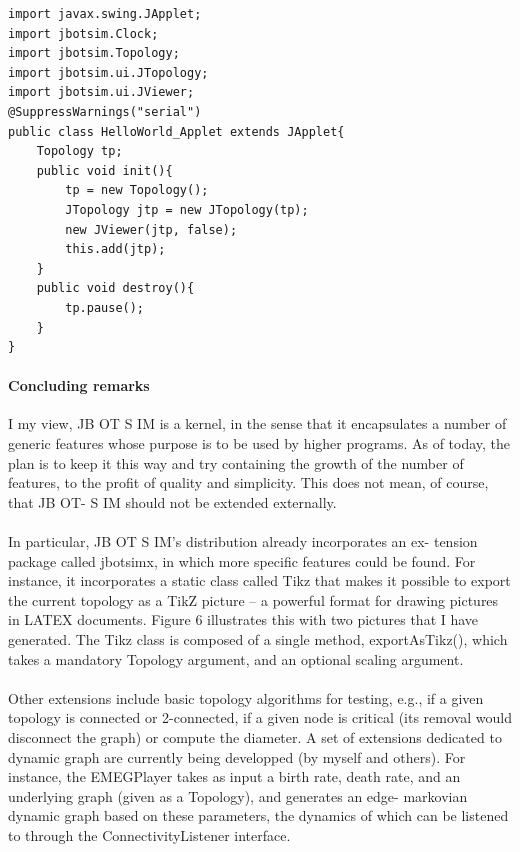 \begin{lstlisting}[caption=Embedding a JB OT S IM demo into a java applet, captionpos=b]
import javax.swing.JApplet;
import jbotsim.Clock;
import jbotsim.Topology;
import jbotsim.ui.JTopology;
import jbotsim.ui.JViewer;
@SuppressWarnings("serial")
public class HelloWorld_Applet extends JApplet{
	Topology tp;
	public void init(){
		tp = new Topology();
		JTopology jtp = new JTopology(tp);
		new JViewer(jtp, false);
		this.add(jtp);
	}
	public void destroy(){
		tp.pause();
	}
}
\end{lstlisting}

\paragraph{Concluding remarks}I my view, JB OT S IM is a kernel, in the sense that it encapsulates a number of generic features whose purpose is to be used by higher programs. As of today, the plan is to keep it this way and try containing the growth of the number of features, to the profit of quality and simplicity. This does not mean, of course, that JB OT- S IM should not be extended externally.
\paragraph{}In particular, JB OT S IM’s distribution already incorporates an ex- tension package called jbotsimx, in which more specific features could be found. For instance, it incorporates a static class called Tikz that makes it possible to export the current topology as a TikZ picture – a powerful format for drawing pictures in LATEX documents. Figure 6 illustrates this with two pictures that I have generated. The Tikz class is composed of a single method, exportAsTikz(), which takes a mandatory Topology argument, and an optional scaling argument.
\paragraph{}Other extensions include basic topology algorithms for testing, e.g., if a given topology is connected or 2-connected, if a given node is critical (its removal would disconnect the graph) or compute the diameter. A set of extensions dedicated to dynamic graph are currently being developped (by myself and others). For instance, the EMEGPlayer takes as input a birth rate, death rate, and an underlying graph (given as a Topology), and generates an edge- markovian dynamic graph based on these parameters, the dynamics of which can be listened to through the ConnectivityListener interface.
